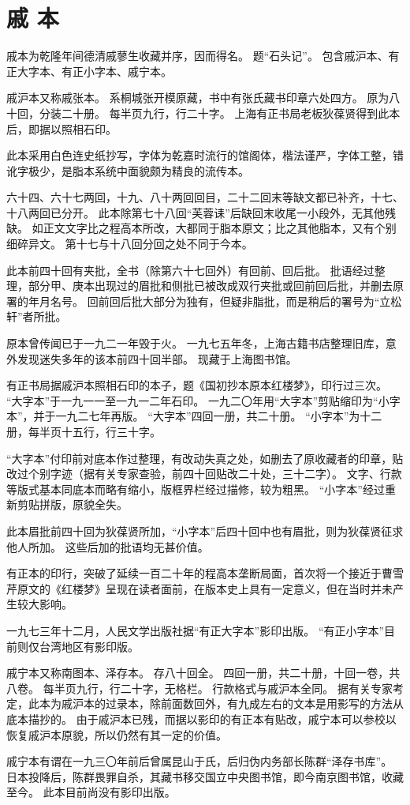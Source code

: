\section*{戚 本}
戚本为乾隆年间德清戚蓼生收藏并序，因而得名。
题“石头记”。
包含戚沪本、有正大字本、有正小字本、戚宁本。
\par
戚沪本又称戚张本。
系桐城张开模原藏，书中有张氏藏书印章六处四方。
原为八十回，分装二十册。
每半页九行，行二十字。
上海有正书局老板狄葆贤得到此本后，即据以照相石印。
\par
此本采用白色连史纸抄写，字体为乾嘉时流行的馆阁体，楷法谨严，字体工整，错讹字极少，是脂本系统中面貌颇为精良的流传本。
\par
六十四、六十七两回，十九、八十两回回目，二十二回末等缺文都已补齐，十七、十八两回已分开。
此本除第七十八回“芙蓉诔”后缺回末收尾一小段外，无其他残缺。
如正文文字比之程高本所改，大都同于脂本原文；比之其他脂本，又有个别细碎异文。
第十七与十八回分回之处不同于今本。
\par
此本前四十回有夹批，全书（除第六十七回外）有回前、回后批。
批语经过整理，部分甲、庚本出现过的眉批和侧批已被改成双行夹批或回前回后批，并删去原署的年月名号。
回前回后批大部分为独有，但疑非脂批，而是稍后的署号为“立松轩”者所批。
\par
原本曾传闻已于一九二一年毁于火。
一九七五年冬，上海古籍书店整理旧库，意外发现迷失多年的该本前四十回半部。
现藏于上海图书馆。
\par
有正书局据戚沪本照相石印的本子，题《国初抄本原本红楼梦》，印行过三次。
“大字本”于一九一一至一九一二年石印。
一九二〇年用“大字本”剪贴缩印为“小字本”，并于一九二七年再版。
“大字本”四回一册，共二十册。
“小字本”为十二册，每半页十五行，行三十字。
\par
“大字本”付印前对底本作过整理，有改动失真之处，如删去了原收藏者的印章，贴改过个别字迹（据有关专家查验，前四十回贴改二十处，三十二字）。
文字、行款等版式基本同底本而略有缩小，版框界栏经过描修，较为粗黑。
“小字本”经过重新剪贴拼版，原貌全失。
\par
此本眉批前四十回为狄葆贤所加，“小字本”后四十回中也有眉批，则为狄葆贤征求他人所加。
这些后加的批语均无甚价值。
\par
有正本的印行，突破了延续一百二十年的程高本垄断局面，首次将一个接近于曹雪芹原文的《红楼梦》呈现在读者面前，在版本史上具有一定意义，但在当时并未产生较大影响。
\par
一九七三年十二月，人民文学出版社据“有正大字本”影印出版。
“有正小字本”目前则仅台湾地区有影印版。
\par
戚宁本又称南图本、泽存本。
存八十回全。
四回一册，共二十册，十回一卷，共八卷。
每半页九行，行二十字，无格栏。
行款格式与戚沪本全同。
据有关专家考定，此本为戚沪本的过录本，除前面数回外，有九成左右的文本是用影写的方法从底本描抄的。
由于戚沪本已残，而据以影印的有正本有贴改，戚宁本可以参校以恢复戚沪本原貌，所以仍然有其一定的价值。
\par
戚宁本有谓在一九三〇年前后曾属昆山于氏，后归伪内务部长陈群“泽存书库”。
日本投降后，陈群畏罪自杀，其藏书移交国立中央图书馆，即今南京图书馆，收藏至今。
此本目前尚没有影印出版。
\par
